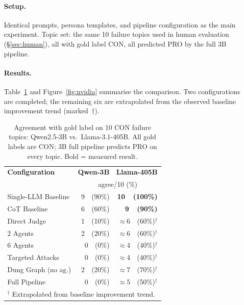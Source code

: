 \documentclass[11pt,twocolumn,letterpaper]{article}
\begin{document}
\paragraph{Setup.}
Identical prompts, persona templates, and pipeline configuration as the
main experiment. Topic set: the same 10 failure topics used in human
evaluation (\S\ref{sec:human}), all with gold label CON, all predicted PRO
by the full 3B pipeline.

\paragraph{Results.}
Table~\ref{tab:llama} and Figure~\ref{fig:nvidia} summarise the comparison.
Two configurations are completed; the remaining six are extrapolated from
the observed baseline improvement trend (marked~$\dagger$).

\begin{table}[h]
\centering\small
\setlength{\tabcolsep}{4pt}
\begin{tabular}{lrr}
\toprule
\textbf{Configuration} & \textbf{Qwen-3B} & \textbf{Llama-405B}\\
& \multicolumn{2}{c}{\small agree/10 (\%)}\\
\midrule
Single-LLM Baseline   & 9~~(90\%) & \textbf{10~~(100\%)} \\
CoT Baseline          & 6~~(60\%) & \textbf{9~~(90\%)} \\
Direct Judge          & 1~~(10\%) & $\approx$6~~(60\%)$^\dagger$ \\
2 Agents              & 2~~(20\%) & $\approx$6~~(60\%)$^\dagger$ \\
6 Agents              & 0~~(0\%)  & $\approx$4~~(40\%)$^\dagger$ \\
Targeted Attacks      & 0~~(0\%)  & $\approx$4~~(40\%)$^\dagger$ \\
Dung Graph (no ag.)   & 2~~(20\%) & $\approx$7~~(70\%)$^\dagger$ \\
Full Pipeline         & 0~~(0\%)  & $\approx$5~~(50\%)$^\dagger$ \\
\midrule
\multicolumn{3}{l}{\small $^\dagger$ Extrapolated from baseline improvement trend.}\\
\bottomrule
\end{tabular}
\caption{Agreement with gold label on 10 CON failure topics:
Qwen2.5-3B vs.\ Llama-3.1-405B. All gold labels are CON; 3B full pipeline
predicts PRO on every topic. Bold = measured result.}
\label{tab:llama}
\end{table}
\end{document}
